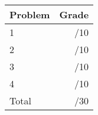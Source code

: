 \documentclass[12pt]{article}
\newcommand{\skipline}{\vspace{12pt}}
\begin{document}
\begin{table}[hbt]
\begin{center}
\begin{tabular}{|l|r|} \hline
Problem&Grade\\
\hline \hline
\cline{1-2} 1 & \enspace\enspace\enspace\enspace\enspace\enspace/10\\
\cline{1-2} 2 & \enspace\enspace\enspace\enspace\enspace\enspace/10\\
\cline{1-2} 3 & \enspace\enspace\enspace\enspace\enspace\enspace/10\\
\cline{1-2} 4 & \enspace\enspace\enspace\enspace\enspace\enspace/10\\
\cline{1-2} Total & \enspace\enspace\enspace\enspace\enspace\enspace/30\\
\hline
\end{tabular}

\skipline

\skipline

\skipline

\end{center}
\end{table}
\newpage
\end{document}
